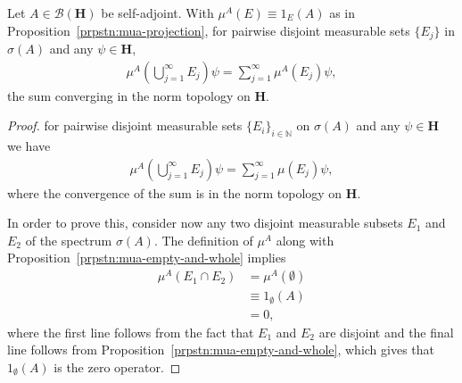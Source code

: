 \begin{proposition}
    \label{prpstn:mua-countably-additive}
    \leanok
    Let $A \in \mathcal{B}(\mathbf{H})$ be self-adjoint. With $\mu^A(E) \equiv 1_E(A)$ as in Proposition~\ref{prpstn:mua-projection}, for pairwise disjoint measurable sets $\{E_j\}$ in $\sigma(A)$ and any $\psi \in \mathbf{H}$,
    \begin{align}
        \mu^A\left( \bigcup_{j=1}^{\infty} E_j \right)\psi = \sum_{j=1}^{\infty} \mu^A(E_j)\psi,
    \end{align}
    the sum converging in the norm topology on $\mathbf{H}$.
\end{proposition}
\begin{proof}
    \leanok
for pairwise disjoint measurable sets $\{ E_i \}_{i \in \mathbb{N}}$ on $\sigma(A)$ and any $\psi \in \mathbf{H}$ we have
\begin{align}
    \mu^A \left( \bigcup_{j = 1}^{\infty} E_j \right) \psi = \sum_{j = 1}^{\infty} \mu(E_j)\psi,
\end{align}
where the convergence of the sum is in the norm topology on $\mathbf{H}$.

In order to prove this, consider now any two disjoint measurable subsets $E_1$ and $E_2$ of the spectrum $\sigma(A)$. The definition of $\mu^A$ along with Proposition~\ref{prpstn:mua-empty-and-whole} implies
\begin{align}
    \mu^A(E_1 \cap E_2) &= \mu^A(\emptyset) \\
                        &\equiv 1_\emptyset(A) \\
                        &= 0,
\end{align}
where the first line follows from the fact that $E_1$ and $E_2$ are disjoint and the final line follows from Proposition~\ref{prpstn:mua-empty-and-whole}, which gives that $1_\emptyset(A)$ is the zero operator.


\end{proof}
